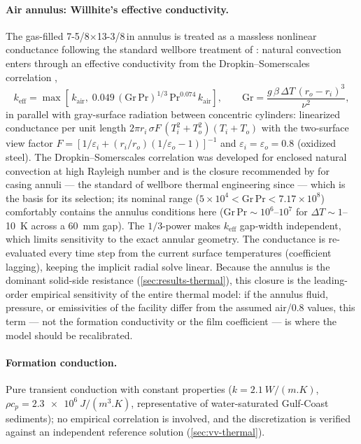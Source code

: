 \documentclass[11pt]{article}
\begin{document}
\paragraph{Air annulus: Willhite's effective conductivity.} The
gas-filled 7-5/8$\times$13-3/8\,in annulus is treated as a massless
nonlinear conductance following the standard wellbore treatment of
\citet{willhite1967}: natural convection enters through an effective
conductivity from the Dropkin--Somerscales correlation
\citep{dropkin1965},
\begin{equation}
k_{\mathrm{eff}} = \max\!\left[\,k_{\mathrm{air}},\;
0.049\,(\mathrm{Gr}\,\mathrm{Pr})^{1/3}\,\mathrm{Pr}^{0.074}\,
k_{\mathrm{air}}\right],
\qquad
\mathrm{Gr} = \frac{g\,\beta\,\Delta T\,(r_o - r_i)^3}{\nu^2},
\label{eq:keff}
\end{equation}
in parallel with gray-surface radiation between concentric cylinders:
linearized conductance per unit length
$2\pi r_i\,\sigma F\,(T_i^2 + T_o^2)(T_i + T_o)$ with the two-surface
view factor
$F = \left[1/\varepsilon_i + (r_i/r_o)(1/\varepsilon_o - 1)
\right]^{-1}$ and $\varepsilon_i = \varepsilon_o = 0.8$ (oxidized
steel). The Dropkin--Somerscales correlation was developed for
enclosed natural convection at high Rayleigh number and is the closure
recommended by \citet{willhite1967} for casing annuli --- the
standard of wellbore thermal engineering since --- which is the basis
for its selection; its nominal range
($5\times10^4 < \mathrm{Gr\,Pr} < 7.17\times10^8$) comfortably
contains the annulus conditions here
($\mathrm{Gr\,Pr} \sim 10^6$--$10^7$ for $\Delta T \sim 1$--
\SI{10}{K} across a \SI{60}{mm} gap). The $1/3$-power makes
$k_{\mathrm{eff}}$ gap-width independent, which limits sensitivity to
the exact annular geometry. The conductance is re-evaluated every
time step from the current surface temperatures (coefficient
lagging), keeping the implicit radial solve linear. Because the
annulus is the dominant solid-side resistance
(\cref{sec:results-thermal}), this closure is the leading-order
empirical sensitivity of the entire thermal model: if the annulus
fluid, pressure, or emissivities of the facility differ from the
assumed air/0.8 values, this term --- not the formation conductivity
or the film coefficient --- is where the model should be recalibrated.

\paragraph{Formation conduction.} Pure transient conduction with
constant properties ($k = \SI{2.1}{W/(m.K)}$,
$\rho c_p = \SI{2.3e6}{J/(m^3.K)}$, representative of water-saturated
Gulf-Coast sediments); no empirical correlation is involved, and the
discretization is verified against an independent reference solution
(\cref{sec:vv-thermal}).
\end{document}
